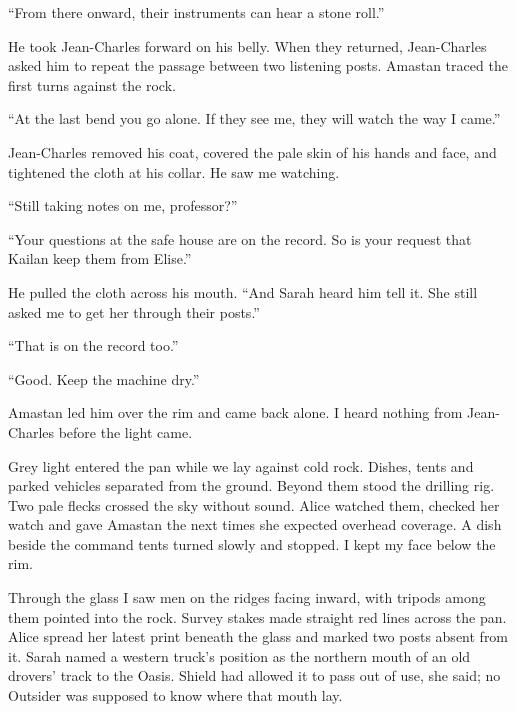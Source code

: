 ``From there onward, their instruments can hear a stone roll.''\par

He took Jean-Charles forward on his belly. When they returned, Jean-Charles asked him to repeat the passage between two listening posts. Amastan traced the first turns against the rock.\par

``At the last bend you go alone. If they see me, they will watch the way I came.''\par

Jean-Charles removed his coat, covered the pale skin of his hands and face, and tightened the cloth at his collar. He saw me watching.\par

``Still taking notes on me, professor?''\par

``Your questions at the safe house are on the record. So is your request that Kailan keep them from Elise.''\par

He pulled the cloth across his mouth. ``And Sarah heard him tell it. She still asked me to get her through their posts.''\par

``That is on the record too.''\par

``Good. Keep the machine dry.''\par

Amastan led him over the rim and came back alone. I heard nothing from Jean-Charles before the light came.\par

Grey light entered the pan while we lay against cold rock. Dishes, tents and parked vehicles separated from the ground. Beyond them stood the drilling rig. Two pale flecks crossed the sky without sound. Alice watched them, checked her watch and gave Amastan the next times she expected overhead coverage. A dish beside the command tents turned slowly and stopped. I kept my face below the rim.\par

Through the glass I saw men on the ridges facing inward, with tripods among them pointed into the rock. Survey stakes made straight red lines across the pan. Alice spread her latest print beneath the glass and marked two posts absent from it. Sarah named a western truck's position as the northern mouth of an old drovers' track to the Oasis. Shield had allowed it to pass out of use, she said; no Outsider was supposed to know where that mouth lay.\par

